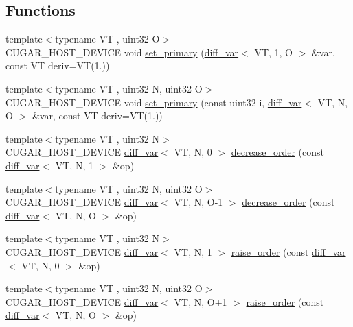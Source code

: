 \subsection*{Functions}
\begin{DoxyCompactItemize}
\item 
{\footnotesize template$<$typename VT , uint32 O$>$ }\\C\+U\+G\+A\+R\+\_\+\+H\+O\+S\+T\+\_\+\+D\+E\+V\+I\+CE void \hyperlink{group___auto_diff_module_gae283602ee3cc33d77e33a2ccdb65e36d}{set\+\_\+primary} (\hyperlink{structcugar_1_1diff__var}{diff\+\_\+var}$<$ VT, 1, O $>$ \&var, const VT deriv=VT(1.))
\item 
{\footnotesize template$<$typename VT , uint32 N, uint32 O$>$ }\\C\+U\+G\+A\+R\+\_\+\+H\+O\+S\+T\+\_\+\+D\+E\+V\+I\+CE void \hyperlink{group___auto_diff_module_gaa768e489a1703901c058e46e319f2d3e}{set\+\_\+primary} (const uint32 i, \hyperlink{structcugar_1_1diff__var}{diff\+\_\+var}$<$ VT, N, O $>$ \&var, const VT deriv=VT(1.))
\item 
{\footnotesize template$<$typename VT , uint32 N$>$ }\\C\+U\+G\+A\+R\+\_\+\+H\+O\+S\+T\+\_\+\+D\+E\+V\+I\+CE \hyperlink{structcugar_1_1diff__var}{diff\+\_\+var}$<$ VT, N, 0 $>$ \hyperlink{group___auto_diff_module_ga4a6a026da6c1dfcc17b9b10140883334}{decrease\+\_\+order} (const \hyperlink{structcugar_1_1diff__var}{diff\+\_\+var}$<$ VT, N, 1 $>$ \&op)
\item 
{\footnotesize template$<$typename VT , uint32 N, uint32 O$>$ }\\C\+U\+G\+A\+R\+\_\+\+H\+O\+S\+T\+\_\+\+D\+E\+V\+I\+CE \hyperlink{structcugar_1_1diff__var}{diff\+\_\+var}$<$ VT, N, O-\/1 $>$ \hyperlink{group___auto_diff_module_ga1ecca883effa0157aba03a1cb7d7d1e9}{decrease\+\_\+order} (const \hyperlink{structcugar_1_1diff__var}{diff\+\_\+var}$<$ VT, N, O $>$ \&op)
\item 
{\footnotesize template$<$typename VT , uint32 N$>$ }\\C\+U\+G\+A\+R\+\_\+\+H\+O\+S\+T\+\_\+\+D\+E\+V\+I\+CE \hyperlink{structcugar_1_1diff__var}{diff\+\_\+var}$<$ VT, N, 1 $>$ \hyperlink{group___auto_diff_module_gadb5d2fdd94aac834a5eabdd1a8497be2}{raise\+\_\+order} (const \hyperlink{structcugar_1_1diff__var}{diff\+\_\+var}$<$ VT, N, 0 $>$ \&op)
\item 
{\footnotesize template$<$typename VT , uint32 N, uint32 O$>$ }\\C\+U\+G\+A\+R\+\_\+\+H\+O\+S\+T\+\_\+\+D\+E\+V\+I\+CE \hyperlink{structcugar_1_1diff__var}{diff\+\_\+var}$<$ VT, N, O+1 $>$ \hyperlink{group___auto_diff_module_ga72857305c1e63bb7b253731201a98d00}{raise\+\_\+order} (const \hyperlink{structcugar_1_1diff__var}{diff\+\_\+var}$<$ VT, N, O $>$ \&op)

\end{DoxyCompactItemize}
